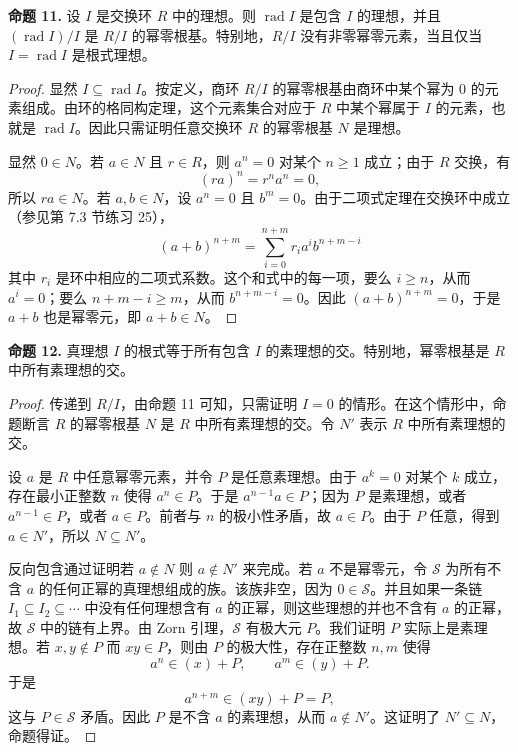 \noindent\textbf{命题 11.} 设 $I$ 是交换环 $R$ 中的理想。则 $\operatorname{rad}I$ 是包含 $I$ 的理想，并且 $(\operatorname{rad}I)/I$ 是 $R/I$ 的幂零根基。特别地，$R/I$ 没有非零幂零元素，当且仅当 $I=\operatorname{rad}I$ 是根式理想。

\begin{proof}
	显然 $I\subseteq \operatorname{rad}I$。按定义，商环 $R/I$ 的幂零根基由商环中某个幂为 $0$ 的元素组成。由环的格同构定理，这个元素集合对应于 $R$ 中某个幂属于 $I$ 的元素，也就是 $\operatorname{rad}I$。因此只需证明任意交换环 $R$ 的幂零根基 $N$ 是理想。
	
	显然 $0\in N$。若 $a\in N$ 且 $r\in R$，则 $a^n=0$ 对某个 $n\geq1$ 成立；由于 $R$ 交换，有
	\[
	(ra)^n=r^na^n=0,
	\]
	所以 $ra\in N$。若 $a,b\in N$，设 $a^n=0$ 且 $b^m=0$。由于二项式定理在交换环中成立（参见第 7.3 节练习 25），
	\[
	(a+b)^{n+m}=\sum_{i=0}^{n+m} r_i a^i b^{n+m-i}
	\]
	其中 $r_i$ 是环中相应的二项式系数。这个和式中的每一项，要么 $i\geq n$，从而 $a^i=0$；要么 $n+m-i\geq m$，从而 $b^{n+m-i}=0$。因此 $(a+b)^{n+m}=0$，于是 $a+b$ 也是幂零元，即 $a+b\in N$。
\end{proof}

\noindent\textbf{命题 12.} 真理想 $I$ 的根式等于所有包含 $I$ 的素理想的交。特别地，幂零根基是 $R$ 中所有素理想的交。

\begin{proof}
	传递到 $R/I$，由命题 11 可知，只需证明 $I=0$ 的情形。在这个情形中，命题断言 $R$ 的幂零根基 $N$ 是 $R$ 中所有素理想的交。令 $N'$ 表示 $R$ 中所有素理想的交。
	
	设 $a$ 是 $R$ 中任意幂零元素，并令 $P$ 是任意素理想。由于 $a^k=0$ 对某个 $k$ 成立，存在最小正整数 $n$ 使得 $a^n\in P$。于是 $a^{n-1}a\in P$；因为 $P$ 是素理想，或者 $a^{n-1}\in P$，或者 $a\in P$。前者与 $n$ 的极小性矛盾，故 $a\in P$。由于 $P$ 任意，得到 $a\in N'$，所以 $N\subseteq N'$。
	
	反向包含通过证明若 $a\notin N$ 则 $a\notin N'$ 来完成。若 $a$ 不是幂零元，令 $\mathcal S$ 为所有不含 $a$ 的任何正幂的真理想组成的族。该族非空，因为 $0\in\mathcal S$。并且如果一条链 $I_1\subseteq I_2\subseteq\cdots$ 中没有任何理想含有 $a$ 的正幂，则这些理想的并也不含有 $a$ 的正幂，故 $\mathcal S$ 中的链有上界。由 Zorn 引理，$\mathcal S$ 有极大元 $P$。我们证明 $P$ 实际上是素理想。若 $x,y\notin P$ 而 $xy\in P$，则由 $P$ 的极大性，存在正整数 $n,m$ 使得
	\[
	a^n\in (x)+P,
	\qquad
	a^m\in (y)+P.
	\]
	于是
	\[
	a^{n+m}\in (xy)+P=P,
	\]
	这与 $P\in\mathcal S$ 矛盾。因此 $P$ 是不含 $a$ 的素理想，从而 $a\notin N'$。这证明了 $N'\subseteq N$，命题得证。
\end{proof}

